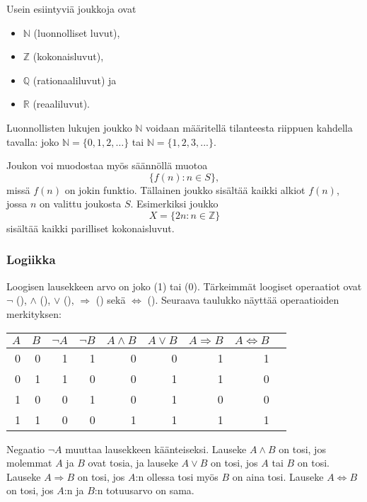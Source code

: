 Usein esiintyviä joukkoja ovat

\begin{itemize}[noitemsep]
\item $\mathbb{N}$ (luonnolliset luvut),
\item $\mathbb{Z}$ (kokonaisluvut),
\item $\mathbb{Q}$ (rationaaliluvut) ja
\item $\mathbb{R}$ (reaaliluvut).
\end{itemize}

Luonnollisten lukujen joukko $\mathbb{N}$ voidaan määritellä
tilanteesta riippuen kahdella tavalla:
joko $\mathbb{N}=\{0,1,2,\ldots\}$
tai $\mathbb{N}=\{1,2,3,...\}$.

Joukon voi muodostaa myös säännöllä muotoa
\[\{f(n) : n \in S\},\]
missä $f(n)$ on jokin funktio.
Tällainen joukko sisältää kaikki alkiot
$f(n)$, jossa $n$ on valittu joukosta $S$.
Esimerkiksi joukko
\[X=\{2n : n \in \mathbb{Z}\}\]
sisältää kaikki parilliset kokonaisluvut.

\subsubsection{Logiikka}


Loogisen lausekkeen arvo on joko  (1) tai
 (0).
Tärkeimmät loogiset operaatiot ovat
$\lnot$ (),
$\land$ (),
$\lor$ (),
$\Rightarrow$ () sekä
$\Leftrightarrow$ ().
Seuraava taulukko näyttää operaatioiden merkityksen:

\begin{center}
\begin{tabular}{rr|rrrrrrr}
$A$ & $B$ & $\lnot A$ & $\lnot B$ & $A \land B$ & $A \lor B$ & $A \Rightarrow B$ & $A \Leftrightarrow B$ \\
\hline
0 & 0 & 1 & 1 & 0 & 0 & 1 & 1 \\
0 & 1 & 1 & 0 & 0 & 1 & 1 & 0 \\
1 & 0 & 0 & 1 & 0 & 1 & 0 & 0 \\
1 & 1 & 0 & 0 & 1 & 1 & 1 & 1 \\
\end{tabular}
\end{center}

Negaatio $\lnot A$ muuttaa lausekkeen käänteiseksi.
Lauseke $A \land B$ on tosi, jos molemmat $A$ ja $B$ ovat tosia,
ja lauseke $A \lor B$ on tosi, jos $A$ tai $B$ on tosi.
Lauseke $A \Rightarrow B$ on tosi,
jos $A$:n ollessa tosi myös $B$ on aina tosi.
Lauseke $A \Leftrightarrow B$ on tosi,
jos $A$:n ja $B$:n totuusarvo on sama.

